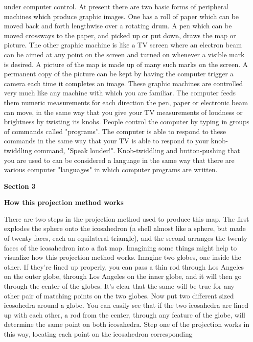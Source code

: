 under computer control.
\bigskip\flushpar
At present there are two basic forms of peripheral
machines which produce graphic images.  One has a roll
of paper which can be moved back and forth lengthwise
over a rotating drum.  A pen which can be moved crossways
to the paper, and picked up or put down, draws the map
or picture.  The other graphic machine is like a TV
screen where an electron beam can be aimed at any point
on the screen and turned on whenever a visible mark is
desired.  A picture of the map is made up of many such
marks on the screen.  A permanent copy of the picture
can be kept by having the computer trigger a camera
each time it completes an image.
\bigskip\flushpar
These graphic machines are controlled very much
like any machine with which you are familiar.  The
computer feeds them numeric measurements for each
direction the pen, paper or electronic beam can move,
in the same way that you give your TV measurements of
loudness or brightness by twisting its knobs.
\bigskip\flushpar
People control the computer by typing in groups
of commands called "programs".  The computer is able
to respond to these commands in the same way that your
TV is able to respond to your knob-twiddling command,
"Speak louder!".  Knob-twiddling and button-pushing that
you are used to can be considered a language in the
same way that there are various computer "languages"
in which computer programs are written.
\vfill\eject
\centerline{\bf Section 3}
\bigskip\centerline{\bf How this projection method works}
\bigskip\bigskip\flushpar
There are two steps in the projection method used
to produce this map.  The first explodes the sphere onto
the icosahedron (a shell almost like a sphere, but made
of twenty faces, each an equilateral triangle), and
the second arranges the twenty faces of the icosahedron
into a flat map.
\bigskip\flushpar
Imagining some things might help to visualize
how this projection method works.  Imagine two globes,
one inside the other.  If they're lined up properly, you
can pass a thin rod through Los Angeles on the outer
globe, through Los Angeles on the inner globe, and it
will then go through the center of the globes.
\bigskip\flushpar
It's clear that the same will be true for any
other pair of matching points on the two globes.
\bigskip\flushpar
Now put two different sized icosohedra around a
globe.  You can easily see that if the two icosahedra
are lined up with each other, a rod from the center,
through any feature of the globe, will determine the same
point on both icosahedra.
\bigskip\flushpar
Step one of the projection works in this way,
locating each point on the icosahedron corresponding
